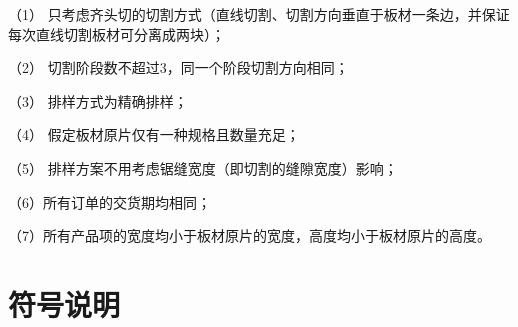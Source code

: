 \documentclass[bwprint]{gmcmthesis}
\begin{document}
（1） 只考虑齐头切的切割方式（直线切割、切割方向垂直于板材一条边，并保证每次直线切割板材可分离成两块）；

（2） 切割阶段数不超过3，同一个阶段切割方向相同；

（3） 排样方式为精确排样；

（4） 假定板材原片仅有一种规格且数量充足；

（5） 排样方案不用考虑锯缝宽度（即切割的缝隙宽度）影响；

（6）所有订单的交货期均相同；

（7）所有产品项的宽度均小于板材原片的宽度，高度均小于板材原片的高度。

\quad

\section{符号说明}
\end{document}
